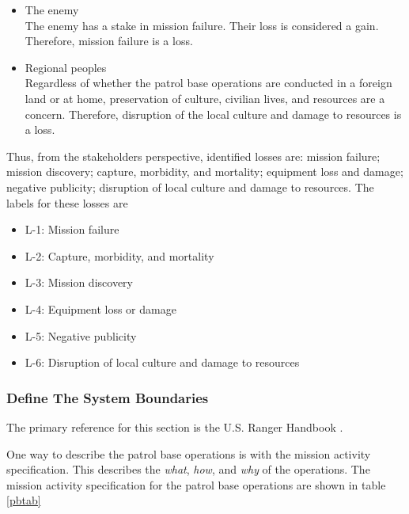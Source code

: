 \documentclass[../../main/main.tex]{subfiles}
\begin{document}
\begin{itemize}
\item The enemy\\
The enemy has a stake in mission failure.  Their loss is considered a gain.  Therefore, mission failure is a loss.  
\item Regional peoples\\
Regardless of whether the patrol base operations are conducted in a foreign land or at home, preservation of culture, civilian lives, and resources are a concern.  Therefore, disruption of the local culture and damage to resources is a loss. 
\end{itemize}

Thus, from the stakeholders perspective, identified losses are: mission failure; mission discovery; capture, morbidity, and mortality; equipment loss and damage; negative publicity; disruption of local culture and damage to resources.  The labels for these losses are 

\begin{itemize}
\item L-1: Mission failure
\item L-2: Capture, morbidity, and mortality
\item L-3: Mission discovery
\item L-4: Equipment loss or damage
\item L-5: Negative publicity
\item L-6: Disruption of local culture and damage to resources
\end{itemize}

\subsubsection{Define The System Boundaries}
The primary reference for this section is the U.S. Ranger Handbook \cite{rangermanual}.

One way to describe the patrol base operations is with the mission activity specification.  This describes the \textit{what}, \textit{how}, and \textit{why} of the operations. The mission activity specification for the patrol base operations are shown in table \ref{pbtab}
\end{document}
